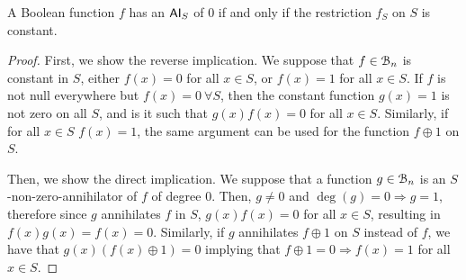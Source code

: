 \documentclass[11pt]{llncs}
\begin{document}



\begin{proposition}\label{prop:constantFs}
	A Boolean function $f$ has an $\mathsf{AI}_S$ of $0$ if and only if the restriction $f_S$ on $S$ is constant.
\end{proposition}
\begin{proof}
	First, we show the reverse implication.
	We suppose that $f\in \mathcal{B}_n$ is constant in $S$, either $f(x) = 0$ for all $x\in S$, or $f(x) = 1$ for all $x\in S$.
	If $f$ is not null everywhere but $f(x) = 0\ \forall S$, then the constant function $g(x) = 1$ is not zero on all $S$, and is it such that $g(x)f(x) = 0$ for all $x\in S$. 
	Similarly, if for all $x\in S$ $f(x) = 1$, the same argument can be used for the function $f\oplus 1$ on $S$.
	
	Then, we show the direct implication.
	We suppose that a function $g\in \mathcal{B}_n$ is an $S$-non-zero-annihilator of $f$ of degree $0$. Then,
	$g \neq 0$ and $\deg(g) = 0 \Rightarrow g = 1$, therefore since $g$ annihilates $f$ in $S$,  $g(x) f(x) = 0$ for all $x \in S$, resulting in $f(x)g(x) = f(x) = 0$.
	Similarly, if $g$ annihilates $f\oplus 1$ on $S$ instead of $f$, we have that $g(x)(f(x) \oplus 1) = 0$ implying that $f\oplus 1 = 0 \Rightarrow f(x) = 1$ for all $x\in S$. 
\end{proof}
\end{document}
